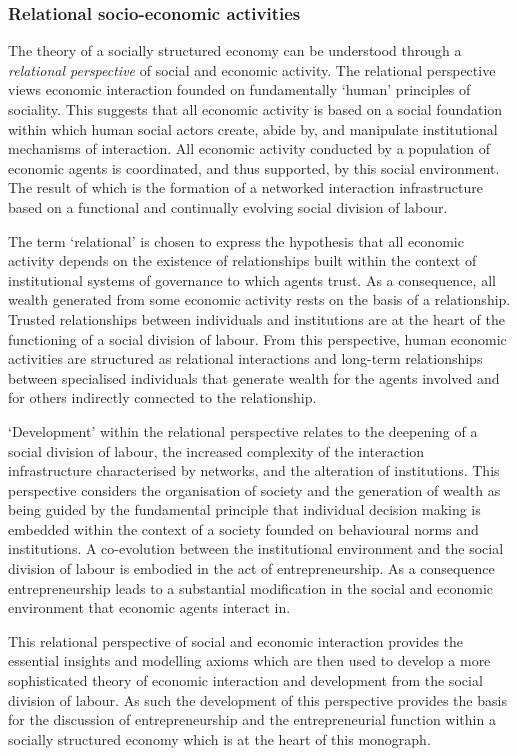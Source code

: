 \subsubsection{Relational socio-economic activities}

The theory of a socially structured economy can be understood through a \emph{relational perspective} of social and economic activity. The relational perspective views economic interaction founded on fundamentally `human' principles of sociality. This suggests that all economic activity is based on a social foundation within which human social actors create, abide by, and manipulate institutional mechanisms of interaction. All economic activity conducted by a population of economic agents is coordinated, and thus supported, by this social environment. The result of which is the formation of a networked interaction infrastructure based on a functional and continually evolving social division of labour.

The term `relational' is chosen to express the hypothesis that all economic activity depends on the existence of relationships built within the context of institutional systems of governance to which agents trust. As a consequence, all wealth generated from some economic activity rests on the basis of a relationship. Trusted relationships between individuals and institutions are at the heart of the functioning of a social division of labour. From this perspective, human economic activities are structured as relational interactions and long-term relationships between specialised individuals that generate wealth for the agents involved and for others indirectly connected to the relationship. 

`Development' within the relational perspective relates to the deepening of a social division of labour, the increased complexity of the interaction infrastructure characterised by networks, and the alteration of institutions. This perspective considers the organisation of society and the generation of wealth as being guided by the fundamental principle that individual decision making is embedded within the context of a society founded on behavioural norms and institutions. A co-evolution between the institutional environment and the social division of labour is embodied in the act of entrepreneurship. As a consequence entrepreneurship leads to a substantial modification in the social and economic environment that economic agents interact in.

This relational perspective of social and economic interaction provides the essential insights and modelling axioms which are then used to develop a more sophisticated theory of economic interaction and development from the social division of labour. As such the development of this perspective provides the basis for the discussion of entrepreneurship and the entrepreneurial function within a socially structured economy which is at the heart of this monograph.

